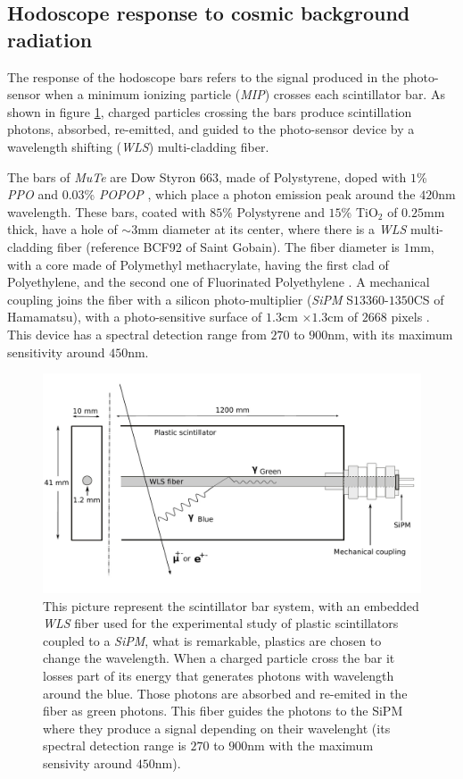 \documentclass[submitting]{nst}
\begin{document}
\subsection{Hodoscope response to cosmic background radiation}\label{sec:hodoscope-response}
The response of the hodoscope bars refers to the signal produced in the photo-sensor when a minimum ionizing particle (\textsl{MIP}) crosses each scintillator bar. As shown in figure \ref{esquema_centelladora}, charged particles crossing the bars produce scintillation photons, absorbed, re-emitted, and guided to the photo-sensor device by a wavelength shifting (\textsl{WLS}) multi-cladding fiber. 

The bars of \textsl{MuTe} are Dow Styron $663$, made of Polystyrene, doped with $1$\% \textsl{PPO} and $0.03$\% \textsl{POPOP} \cite{PlaBrossRykalin2003}, which place a photon emission peak around the $420$nm wavelength. These bars, coated with $85$\% Polystyrene and $15$\% TiO$_2$ of $0.25$mm thick, have a hole of $\sim 3$mm diameter at its center, where there is a \textsl{WLS} multi-cladding fiber (reference BCF92 of Saint Gobain). The fiber diameter is $1$mm, with a core made of Polymethyl methacrylate, having the first clad of Polyethylene, and the second one of Fluorinated Polyethylene \cite{SaintGobain2017}. A mechanical coupling joins the fiber with a silicon photo-multiplier (\textsl{SiPM} S$13360$-$1350$CS of Hamamatsu), with a photo-sensitive surface of $1.3$cm $\times 1.3$cm of $2668$ pixels \cite{Hamamatsu2018}. This device has a spectral detection range from $270$ to $900$nm, with its maximum sensitivity around $450$nm.

\begin{figure}[h!] %
    \centering
        \includegraphics[scale=0.21]{Figures/esquema_barra.jpeg}
   \caption{This picture represent the scintillator bar system, with an embedded \textsl{WLS} fiber used for the experimental study of plastic scintillators coupled to a \textsl{SiPM}, what is remarkable, plastics are chosen to change the wavelength. When a charged particle cross the bar it losses part of its energy that generates photons with wavelength around the blue. Those photons are absorbed and re-emited in the fiber as green photons. This fiber guides the photons to the SiPM where they produce a signal depending on their wavelenght (its spectral detection range is $270$ to $900$nm with the maximum sensivity around $450$nm).}\label{esquema_centelladora}
\end{figure}
\end{document}
